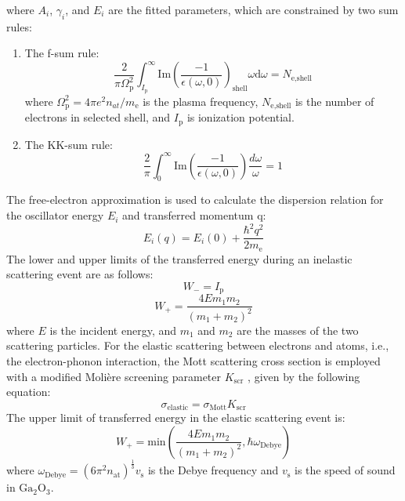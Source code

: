 \documentclass[%
reprint,
superscriptaddress,
 amsmath,amssymb,
 aps,
]{revtex4-2}
\newcommand{\ga}{$\text{Ga}_2\text{O}_3$}
\begin{document}
where $A_{i}$, $\gamma_{i}$, and $E_{i}$ are the fitted parameters, which are 
constrained by two sum rules: 
\begin{enumerate} 
\item The f-sum rule: 
\begin{equation} 
\frac{2}{\pi 
\Omega_{\text{p}}^{2}}\int_{I_{\text{p}}}^{\infty}\mathrm{Im}(\frac{-1}{\epsilon(\omega,0)})_{\text{shell}}\omega 
\mathrm{d}\omega = N_{\text{e,shell}} 
\end{equation} 
where $\Omega_{\text{p}}^{2}=4\pi e^{2}n_{at}/m_{\text{e}}$ is the plasma frequency, 
$N_{\text{e,shell}}$ is the number of electrons in selected shell, and $I_{\text{p}}$ is 
ionization potential. 
\item The KK-sum rule: 
\begin{equation} 
\frac{2}{\pi}\int_{0}^{\infty} 
\mathrm{Im}(\frac{-1}{\epsilon(\omega,0)})\frac{d\omega}{\omega} = 1 
\end{equation} 
\end{enumerate} 
The free-electron approximation is used to calculate the dispersion relation 
for the oscillator energy $E_{i}$ and transferred momentum q: 
\begin{equation} 
E_{i}(q) = E_{i}(0) + \frac{\hbar^{2}q^{2}}{2m_{\text{e}}} 
\end{equation} 
The lower and upper limits of the transferred energy during an inelastic 
scattering event are as follows: 
\begin{equation} 
W_{-} = I_{\text{p}} 
\end{equation} 
\begin{equation} 
W_{+} = \frac{4Em_{1}m_{2}}{(m_{1}+m_{2})^{2}} 
\end{equation} 
where $E$ is the incident energy, and $m_{1}$ and $m_{2}$ are the masses of the 
two scattering particles. 
For the elastic scattering between electrons and atoms, i.e., the 
electron-phonon interaction, the Mott scattering cross section is employed with 
a modified Moli\`ere screening parameter $K_{\text{scr}}$ \cite{Jenkins2012}, given 
by the following equation: 
\begin{equation} 
\sigma_{\text{elastic}} = \sigma_{\text{Mott}}K_{\text{scr}} 
\end{equation} 
The upper limit of transferred energy in the elastic scattering event is: 
\begin{equation} 
W_{+} = \mathrm{min}(\frac{4Em_{1}m_{2}}{(m_{1}+m_{2})^{2}}, 
\hbar\omega_{\text{Debye}}) 
\end{equation} 
where $\omega_{\text{Debye}}=(6\pi^{2}n_{\text{at}})^{\frac{1}{3}}v_{\text{s}}$ is the Debye 
frequency and $v_{\text{s}}$ is the speed of sound in \ga. 
 
\end{document}
